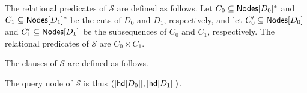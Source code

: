 The relational predicates of $\mathcal{S}$ are defined as follows.
%
Let $C_0 \subseteq \mathsf{Nodes}[ D_0 ]^{*}$ and $C_1 \subseteq
\mathsf{Nodes}[ D_1 ]^{*}$ be the cuts of $D_0$ and $D_1$, respectively, and let
$C_0' \subseteq \mathsf{Nodes}[ D_0 ]$ and $C_1' \subseteq \mathsf{Nodes}[ D_1 ]$ be the
subsequences of $C_0$ and $C_1$, respectively.
%
The relational predicates of $\mathcal{S}$ are $C_0 \times C_1$.

The clauses of $\mathcal{S}$ are defined as follows.

%

%

The query node of $\mathcal{S}$ is thus $( [ \mathsf{hd}[ D_0 ] ], [
\mathsf{hd}[ D_1 ] ])$.

